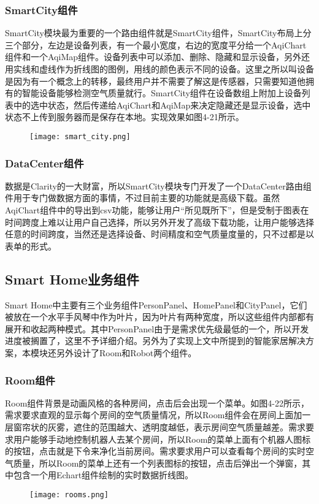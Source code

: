 \subsubsection{SmartCity组件}
SmartCity模块最为重要的一个路由组件就是SmartCity组件，SmartCity布局上分三个部分，左边是设备列表，有一个最小宽度，右边的宽度平分给一个AqiChart组件和一个AqiMap组件。设备列表中可以添加、删除、隐藏和显示设备，另外还用实线和虚线作为折线图的图例，用线的颜色表示不同的设备。这里之所以叫设备是因为有一个概念上的转移，最终用户并不需要了解这是传感器，只需要知道他拥有的智能设备能够检测空气质量就行。SmartCity组件在设备数组上附加上设备列表中的选中状态，然后传递给AqiChart和AqiMap来决定隐藏还是显示设备，选中状态不上传到服务器而是保存在本地。实现效果如图4-21所示。
\begin{figure}[!htp]
 \centering
 \texttt{[image: smart\_city.png]}
\end{figure}
\subsubsection{DataCenter组件}
数据是Clarity的一大财富，所以SmartCity模块专门开发了一个DataCenter路由组件用于专门做数据方面的事情，不过目前主要的功能就是高级下载。虽然AqiChart组件中的导出到csv功能，能够让用户“所见既所下”，但是受制于图表在时间跨度上难以让用户自己选择，所以另外开发了高级下载功能，让用户能够选择任意的时间跨度，当然还是选择设备、时间精度和空气质量度量的，只不过都是以表单的形式。

\subsection{Smart Home业务组件}
Smart Home中主要有三个业务组件PersonPanel、HomePanel和CityPanel，它们被放在一个水平手风琴中作为叶片，因为叶片有两种宽度，所以这些组件内部都有展开和收起两种模式。其中PersonPanel由于是需求优先级最低的一个，所以开发进度被搁置了，这里不予详细介绍。另外为了实现上文中所提到的智能家居解决方案，本模块还另外设计了Room和Robot两个组件。
\subsubsection{Room组件}
Room组件背景是动画风格的各种房间，点击后会出现一个菜单。如图4-22所示，需求要求直观的显示每个房间的空气质量情况，所以Room组件会在房间上面加一层窗帘状的灰雾，遮住的范围越大、透明度越低，表示房间空气质量越差。需求要求用户能够手动地控制机器人去某个房间，所以Room的菜单上面有个机器人图标的按钮，点击就是下令来净化当前房间。需求要求用户可以查看每个房间的实时空气质量，所以Room的菜单上还有一个列表图标的按钮，点击后弹出一个弹窗，其中包含一个用Echart组件绘制的实时数据折线图。
\begin{figure}[!htp]
 \centering
 \texttt{[image: rooms.png]}
\end{figure}
